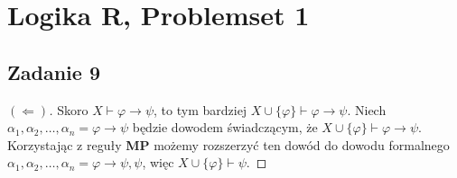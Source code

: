 \chapter{Logika R, Problemset 1}

\section*{Zadanie 9}

\begin{proof}[\( (\Leftarrow) \)]
    Skoro \( X \vdash \varphi \to \psi \), to tym bardziej \( X \cup \{\varphi\} \vdash \varphi \to \psi \). Niech \( \alpha_1, \alpha_2, \ldots, \alpha_n = \varphi \to \psi \) będzie dowodem świadczącym, że \( X \cup \{ \varphi \} \vdash \varphi \to \psi \). Korzystając z reguły \textbf{MP} możemy rozszerzyć ten dowód do dowodu formalnego \( \alpha_1, \alpha_2, \ldots, \alpha_n = \varphi \to \psi, \psi \), więc \( X \cup \{\varphi\} \vdash \psi \).
\end{proof}

